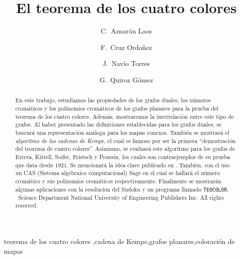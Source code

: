 \documentclass[3p,times,a4paper,twocolumn,authoryear]{elsarticle} %
\begin{document}
\begin{abstract}

En este trabajo, estudiamos las propiedades de los grafos duales, los números cromáticos y los polinomios cromáticos de los grafos planares para la prueba del teorema de los cuatro colores. Además, mostraremos la interrelación entre este tipo de grafos. Al haber presentado las definiciones establecidas para los grafos duales, se buscará una representación análoga para los mapas conexos. También se mostrará el \emph{algoritmo de las cadenas de Kempe}, el cual es famoso por ser la primera ``demostración del teorema de cuatro colores''. Asimismo, se evaluará este algoritmo para los grafos de Errera, Kittell, Soifer, Fristsch y Poussin, los cuales son contraejemplos de su prueba que data desde 1921. Se mencionará la idea clave \citeauthor{birkhoff} publicado en \cite{birkhoff}. También, con el uso un CAS (Sistema algebraico computacional) Sage en el cual se hallará el número cromático y sus polinomios cromáticos respectivamente. Finalmente se mostrarán algunas aplicaciones con la resolución del Sudoku y un programa llamado \texttt{TEOCOLOR}.
\\[1mm]
\textcopyright\ Science Department National University of Engineering Publishers Inc. All rights reserved.

\end{abstract}

\begin{keyword}
teorema de los cuatro colores \sep cadena de Kempe\sep grafos planares\sep coloración de mapas
\end{keyword}

\begin{frontmatter}

\title{El teorema de los cuatro colores}

\author[1,3]{C.~Aznarán Laos}


\author[1,3]{F.~Cruz Ordoñez}

\author[2,3]{J.~Navío Torres}

\author[1,3]{G.~Quiroz Gómez}

\address[1]{Facultad de Ciencias - Escuela Profesional de Ciencia de la Computación}
\address[2]{Facultad de Ciencias - Escuela Profesional de Matemática}
\address[3]{Universidad Nacional de Ingeniería,	Av. Túpac Amaru 210, Rímac, Lima 25, Perú}

\end{frontmatter}
\end{document}
